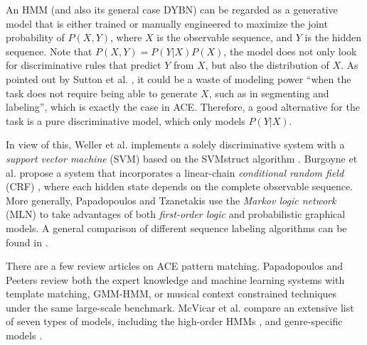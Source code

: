 An HMM (and also its general case DYBN) can be regarded as a generative model that is either trained or manually engineered to maximize the joint probability of $P(X,Y)$, where $X$ is the observable sequence, and $Y$ is the hidden sequence. Note that $P(X,Y) = P(Y|X)P(X)$, the model does not only look for discriminative rules that predict $Y$ from $X$, but also the distribution of $X$. As pointed out by Sutton et al. \cite{sutton2007dynamic}, it could be a waste of modeling power ``when the task does not require being able to generate $X$, such as in segmenting and labeling'', which is exactly the case in ACE. Therefore, a good alternative for the task is a pure discriminative model, which only models $P(Y|X)$.

In view of this, Weller et al. \cite{weller2009structured} implements a solely discriminative system with a {\it support vector machine} (SVM) \cite{cortes1995support} based on the SVMstruct algorithm \cite{tsochantaridis2005large}. Burgoyne et al. propose a system \cite{burgoyne2007cross} that incorporates a linear-chain {\it conditional random field} (CRF) \cite{lafferty2001conditional}, where each hidden state depends on the complete observable sequence. More generally, Papadopoulos and Tzanetakis \cite{papadopoulos2012modeling} use the {\it Markov logic network} (MLN) \cite{richardson2006markov} to take advantages of both {\it first-order logic} and probabilistic graphical models. A general comparison of different sequence labeling algorithms can be found in \cite{nguyen2007comparisons}.

There are a few review articles on ACE pattern matching. Papadopoulos and Peeters \cite{papadopoulos2007large} review both the expert knowledge and machine learning systems with template matching, GMM-HMM, or musical context constrained techniques under the same large-scale benchmark. McVicar et al. \cite{mcvicar2014automatic} compare an extensive list of seven types of models, including the high-order HMMs \cite{scholz2009robust,mauch2007discovering,khadkevich2009use,yoshii2011vocabulary}, and genre-specific models \cite{lee2008acoustic,lee2007system}.


